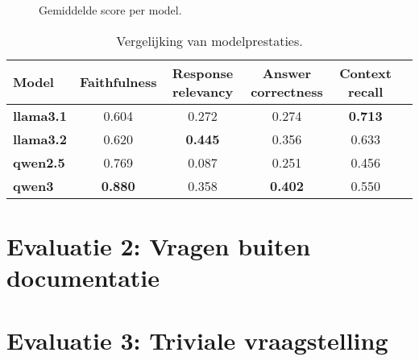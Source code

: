 \begin{figure}[H]
    \centering
    \caption{Gemiddelde score per model.}
    \label{fig:gemiddelde_score_per_model}
\end{figure}

\begin{table}[H]
    \begin{tabular}{|l|c|c|c|c|c|}
        \hline
        \textbf{Model} & \textbf{Faithfulness} & \textbf{Response relevancy} & \textbf{Answer correctness} & \textbf{Context recall} \\
        \hline
        \textbf{llama3.1} & 0.604 & 0.272 & 0.274 & \textbf{0.713} \\
        \textbf{llama3.2} & 0.620 & \textbf{0.445} & 0.356 & 0.633 \\
        \textbf{qwen2.5}  & 0.769 & 0.087 & 0.251 & 0.456 \\
        \textbf{qwen3}    & \textbf{0.880} & 0.358 & \textbf{0.402} & 0.550 \\
        \hline
    \end{tabular}
    \caption{Vergelijking van modelprestaties.}
    \label{tab:modelvergelijking}
\end{table}

\section{Evaluatie 2: Vragen buiten documentatie}


\section{Evaluatie 3: Triviale vraagstelling}

